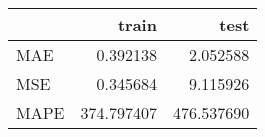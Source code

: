 \begin{tabular}{lrr}
\toprule
{} &       train &        test \\
\midrule
MAE  &    0.392138 &    2.052588 \\
MSE  &    0.345684 &    9.115926 \\
MAPE &  374.797407 &  476.537690 \\
\bottomrule
\end{tabular}
